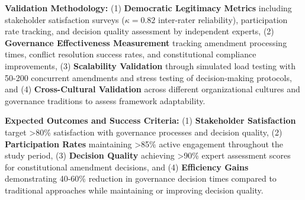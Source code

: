 \documentclass[manuscript,screen,review,anonymous,9pt]{acmart}
\begin{document}
\textbf{Validation Methodology:} (1) \textbf{Democratic Legitimacy Metrics} including stakeholder satisfaction surveys ($\kappa = 0.82$ inter-rater reliability), participation rate tracking, and decision quality assessment by independent experts, (2) \textbf{Governance Effectiveness Measurement} tracking amendment processing times, conflict resolution success rates, and constitutional compliance improvements, (3) \textbf{Scalability Validation} through simulated load testing with 50-200 concurrent amendments and stress testing of decision-making protocols, and (4) \textbf{Cross-Cultural Validation} across different organizational cultures and governance traditions to assess framework adaptability.

\textbf{Expected Outcomes and Success Criteria:} (1) \textbf{Stakeholder Satisfaction} target >80\% satisfaction with governance processes and decision quality, (2) \textbf{Participation Rates} maintaining >85\% active engagement throughout the study period, (3) \textbf{Decision Quality} achieving >90\% expert assessment scores for constitutional amendment decisions, and (4) \textbf{Efficiency Gains} demonstrating 40-60\% reduction in governance decision times compared to traditional approaches while maintaining or improving decision quality.
\end{document}

